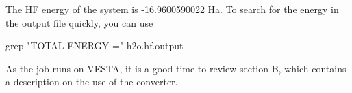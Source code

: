 The HF energy of the
system is -16.9600590022 Ha. To search for the energy in the output file quickly, you can
use 
\begin{shade}
grep "TOTAL ENERGY =" h2o.hf.output
\end{shade}
As the job runs on VESTA, it is a good time to review section B, which contains a description on the use of the converter.


